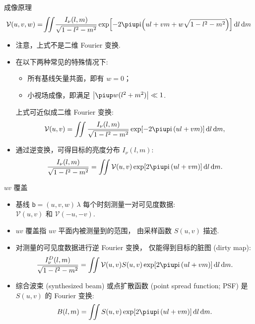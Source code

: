 \documentclass{beamer}
\newcommand{\R}[1]{\text{#1}}  %
\newcommand{\Ci}{\R{i}}  %
\newcommand{\Cpi}{\piup}  %
\newcommand{\B}[1]{\bm{\mathsf{#1}}}  %
\newcommand{\D}[1]{\R{d}#1}
\begin{document}
\begin{frame}{成像原理}
  \begin{equation}
    \mathcal{V}(u,v,w)
      = \!\iint \!\frac{I_{\nu}(l,m)}{\sqrt{1-l^2-m^2}}
      \exp \!\left[ -2\Cpi\Ci \!\left( ul+vm+w\sqrt{1-l^2-m^2} \right) \right]
      \D{l}\,\D{m}
  \end{equation}

  \begin{itemize}
    \item 注意，上式\alert{不是}二维 Fourier 变换.
    \item 在以下两种常见的特殊情况下:
      \begin{itemize}
        \item 所有基线矢量共面，即有 $w = 0$；
        \item 小视场成像，即满足 $\big| \Cpi w(l^2+m^2) \big| \ll 1$.
      \end{itemize}
      上式可近似成二维 Fourier 变换:
      \begin{equation}
        \mathcal{V}(u,v)
          = \iint \frac{I_{\nu}(l,m)}{\sqrt{1-l^2-m^2}}
            \exp [-2\Cpi\Ci\, (ul+vm)] \,\D{l}\,\D{m},
      \end{equation}
    \item 通过逆变换，可得目标的亮度分布 $I_{\nu}(l,m)$:
      \begin{equation}
        \frac{I_{\nu}(l,m)}{\sqrt{1-l^2-m^2}}
          = \iint \mathcal{V}(u,v)
            \exp [2\Cpi\Ci\, (ul+vm)] \,\D{l}\,\D{m}.
      \end{equation}
  \end{itemize}
\end{frame}

\begin{frame}{$uv$ 覆盖}
  \begin{itemize}
    \item 基线 $\B{b} = (u,v,w) \,\lambda$ 每个时刻测量一对可见度数据: \\
      $\mathcal{V}(u,v)$ 和 $\mathcal{V}(-u,-v)$.
    \item \alert{$uv$ 覆盖}指 $uv$ 平面内被测量到的范围，
      由\alert{采样函数} $S(u,v)$ 描述.
    \item 对测量的可见度数据进行逆 Fourier 变换，
      仅能得到目标的\alert{脏图 (dirty map)}:
      \begin{equation}
        \frac{I_{\nu}^D(l,m)}{\sqrt{1-l^2-m^2}}
          = \iint \mathcal{V}(u,v) S(u,v)
            \exp [2\Cpi\Ci\, (ul+vm)] \,\D{l}\,\D{m}.
      \end{equation}
    \item \alert{综合波束 (synthesized beam)}
      或\alert{点扩散函数 (point spread function; PSF)}
      是 $S(u,v)$ 的 Fourier 变换:
      \begin{equation}
        B(l,m) = \iint S(u,v) \exp [2\Cpi\Ci\, (ul+vm)] \,\D{l}\,\D{m}.
      \end{equation}
  \end{itemize}
\end{frame}
\end{document}
